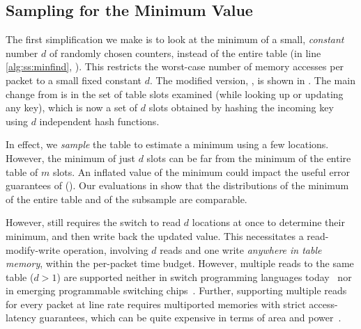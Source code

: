 \subsection{Sampling for the Minimum Value}
\label{sec:sampling-d}

The first simplification we make is to look at the minimum of a small, {\em
  constant} number $d$ of randomly chosen counters, instead of the entire table
(in line \ref{alg:ss:minfind}, ). This restricts the worst-case
number of memory accesses per packet to a small fixed constant $d$.  The
modified version, \Baseline, is shown in . The main change from
 is in the set of table slots examined (while looking up or
updating any key), which is now a set of $d$ slots obtained by hashing the
incoming key using $d$ independent hash functions.

In effect, we {\em sample} the table to estimate a minimum using a few
locations. However, the minimum of just $d$ slots can be far from the minimum of
the entire table of $m$ slots. An inflated value of the minimum could impact the
useful error guarantees of \spacesaving (). %
Our evaluations in  show that the distributions of the
minimum of the entire table and of the subsample are comparable.



However,  still requires the switch to read $d$ locations at once
to determine their minimum, and then write back the updated value. This
necessitates a read-modify-write operation, involving $d$ reads and one write
{\em anywhere in table memory}, within the per-packet time budget. However,
multiple reads to the same table ($d > 1$) are supported neither in switch
programming languages today~\cite{bosshart2014p4} nor in emerging programmable
switching chips~\cite{RMT}. Further, supporting multiple reads for every packet
at line rate requires multiported memories with strict access-latency
guarantees, which can be quite expensive in terms of area and
power~\cite{cmos-vlsi-design-book, vlsi-memory-lecture}.

